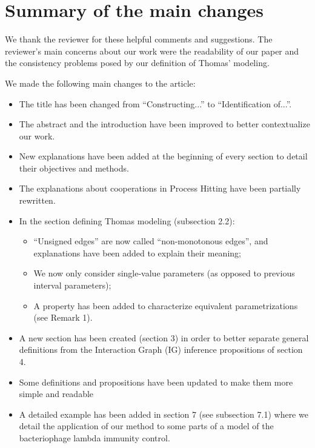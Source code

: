 \documentclass[11pt]{article}
\begin{document}
\section*{Summary of the main changes}

We thank the reviewer for these helpful comments and suggestions.
The reviewer's main concerns about our work were the readability of our paper and the consistency problems posed by our definition of Thomas' modeling.

We made the following main changes to the article:
\begin{itemize}
  \item The title has been changed from “Constructing...” to “Identification of...”.
  \item The abstract and the introduction have been improved to better contextualize our work.
  \item New explanations have been added at the beginning of every section
    to detail their objectives and methods.
  \item The explanations about cooperations in Process Hitting have been partially rewritten.
  \item In the section defining Thomas modeling (subsection 2.2):
    \begin{itemize}
      \item “Unsigned edges” are now called “non-monotonous edges”,
        and explanations have been added to explain their meaning;
      \item We now only consider single-value parameters
        (as opposed to previous interval parameters);
      \item A property has been added to characterize equivalent parametrizations
        (see Remark 1).
    \end{itemize}
  \item A new section has been created (section 3)
    in order to better separate general definitions 
    from the Interaction Graph (IG) inference propositions of section 4.
  \item Some definitions and propositions have been updated to make them more simple and readable
  \item A detailed example has been added in section 7 (see subsection 7.1)
    where we detail the application of our method to some parts of a model of
    the bacteriophage lambda immunity control.
\end{itemize}
\end{document}
